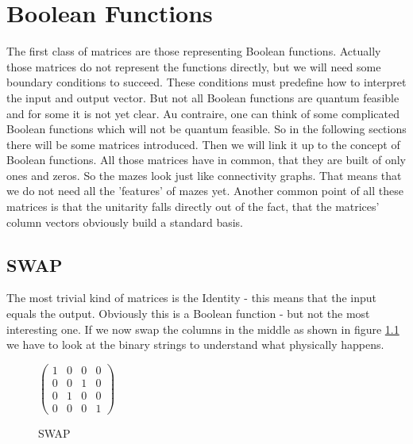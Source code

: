 \documentclass[oneside]{thesisclass}
\begin{document}
\chapter{Boolean Functions}
The first class of matrices are those representing Boolean functions.
Actually those matrices do not represent the functions directly, but we will need some boundary conditions to succeed.
These conditions must predefine how to interpret the input and output vector.
But not all Boolean functions are quantum feasible and for some it is not yet clear.
Au contraire, one can think of some complicated Boolean functions which will not be quantum feasible.
So in the following sections there will be some matrices introduced.
Then we will link it up to the concept of Boolean functions.
All those matrices have in common, that they are built of only ones and zeros.
So the mazes look just like connectivity graphs. 
That means that we do not need all the 'features' of mazes yet.
Another common point of all these matrices is that the unitarity falls directly out of the fact, that the matrices' column vectors obviously build a standard basis.\\

\section{SWAP}
The most trivial kind of matrices is the Identity - this means that the input equals the output.
Obviously this is a Boolean function - but not the most interesting one.
If we now swap the columns in the middle as shown in figure \ref{swap} we have to look at the binary strings to understand what physically happens.

\begin{figure}
\begin{center}
  $
 \begin{pmatrix}
  1 & 0 & 0 & 0 \\
  0 & 0 & 1 & 0 \\
  0 & 1 & 0 & 0 \\
  0 & 0 & 0 & 1
  \end{pmatrix}
 $
 \caption{SWAP}
 \label{swap}
 \end{center}
\end{figure}
\end{document}
